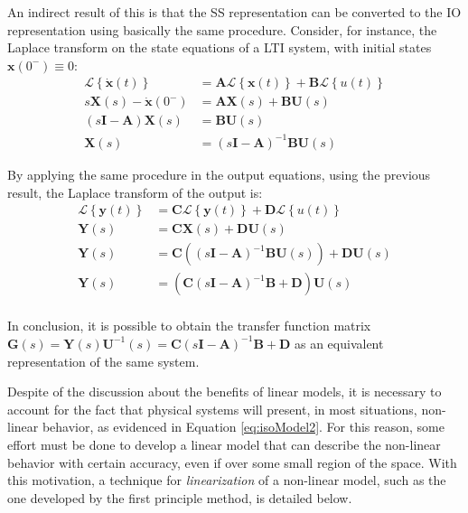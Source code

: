 \documentclass[a4paper,11pt]{book}
\numberwithin{figure}{chapter}
\numberwithin{equation}{chapter}
\numberwithin{table}{chapter}
\theoremstyle{definition}
\begin{document}
An indirect result of this is that the SS representation can be converted to the IO representation using basically the same procedure. Consider, for instance, the Laplace transform on the state equations of a LTI system, with initial states $\bm{x}(0^-) \equiv 0$:
\begin{equation} \label{eq:convertSSIO01}
\begin{split}
	\mathcal{L} \left\{ \dot{\bm{x}}(t) \right\} &= \bm{A} \mathcal{L} \left\{ \bm{x}(t) \right\} + \bm{B} \mathcal{L} \left\{ u(t) \right\} \\
	s \bm{X}(s) - \dot{\bm{x}}(0^-) &= \bm{A} \bm{X}(s) + \bm{B} \bm{U}(s) \\
	(s\bm{I}  - \bm{A}) \bm{X}(s) &=  \bm{B} \bm{U}(s) \\
	 \bm{X}(s) &= (s\bm{I}  - \bm{A})^{-1} \bm{B} \bm{U}(s)
\end{split}
\end{equation}

By applying the same procedure in the output equations, using the previous result, the Laplace transform of the output is:
\begin{equation} \label{eq:convertSSIO02}
\begin{split}
	\mathcal{L} \left\{ \bm{y}(t) \right\} &= \bm{C} \mathcal{L} \left\{ \bm{y}(t) \right\} + \bm{D} \mathcal{L} \left\{ u(t) \right\} \\
	\bm{Y}(s)  &= \bm{C} \bm{X}(s) + \bm{D} \bm{U}(s) \\
	\bm{Y}(s)  &= \bm{C} \left( (s\bm{I}  - \bm{A})^{-1} \bm{B} \bm{U}(s) \right) + \bm{D} \bm{U}(s) \\
	\bm{Y}(s)  &= \left( \bm{C} (s\bm{I} - \bm{A})^{-1} \bm{B}   + \bm{D} \right) \bm{U}(s) \\
\end{split}
\end{equation}

In conclusion, it is possible to obtain the transfer function matrix $\bm{G}(s) = \bm{Y}(s)\bm{U}^{-1}(s) = \bm{C} (s\bm{I} - \bm{A})^{-1} \bm{B}   + \bm{D}$ as an equivalent representation of the same system.

Despite of the discussion about the benefits of linear models, it is necessary to account for the fact that physical systems will present, in most situations, non-linear behavior, as evidenced in Equation \eqref{eq:isoModel2}. For this reason, some effort must be done to develop a linear model that can describe the non-linear behavior with certain accuracy, even if over some small region of the space. With this motivation, a technique for \textit{linearization} of a non-linear model, such as the one developed by the first principle method, is detailed below.
\end{document}
